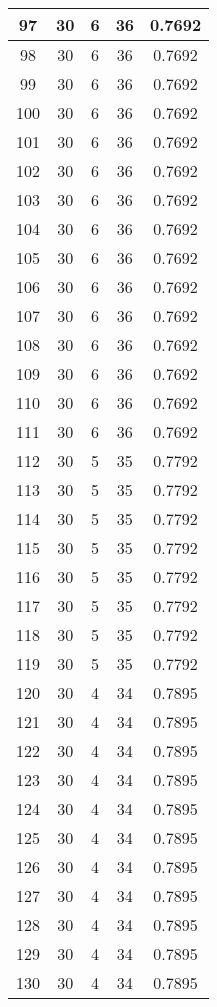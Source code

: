 \documentclass[letterpaper, 12pt]{article}
\begin{document}
\begin{longtable}{|c|c|c|c|c|}
\hline
97 & 30 & 6 & 36 & 0.7692 \\
\hline
98 & 30 & 6 & 36 & 0.7692 \\
\hline
99 & 30 & 6 & 36 & 0.7692 \\
\hline
100 & 30 & 6 & 36 & 0.7692 \\
\hline
101 & 30 & 6 & 36 & 0.7692 \\
\hline
102 & 30 & 6 & 36 & 0.7692 \\
\hline
103 & 30 & 6 & 36 & 0.7692 \\
\hline
104 & 30 & 6 & 36 & 0.7692 \\
\hline
105 & 30 & 6 & 36 & 0.7692 \\
\hline
106 & 30 & 6 & 36 & 0.7692 \\
\hline
107 & 30 & 6 & 36 & 0.7692 \\
\hline
108 & 30 & 6 & 36 & 0.7692 \\
\hline
109 & 30 & 6 & 36 & 0.7692 \\
\hline
110 & 30 & 6 & 36 & 0.7692 \\
\hline
111 & 30 & 6 & 36 & 0.7692 \\
\hline
112 & 30 & 5 & 35 & 0.7792 \\
\hline
113 & 30 & 5 & 35 & 0.7792 \\
\hline
114 & 30 & 5 & 35 & 0.7792 \\
\hline
115 & 30 & 5 & 35 & 0.7792 \\
\hline
116 & 30 & 5 & 35 & 0.7792 \\
\hline
117 & 30 & 5 & 35 & 0.7792 \\
\hline
118 & 30 & 5 & 35 & 0.7792 \\
\hline
119 & 30 & 5 & 35 & 0.7792 \\
\hline
120 & 30 & 4 & 34 & 0.7895 \\
\hline
121 & 30 & 4 & 34 & 0.7895 \\
\hline
122 & 30 & 4 & 34 & 0.7895 \\
\hline
123 & 30 & 4 & 34 & 0.7895 \\
\hline
124 & 30 & 4 & 34 & 0.7895 \\
\hline
125 & 30 & 4 & 34 & 0.7895 \\
\hline
126 & 30 & 4 & 34 & 0.7895 \\
\hline
127 & 30 & 4 & 34 & 0.7895 \\
\hline
128 & 30 & 4 & 34 & 0.7895 \\
\hline
129 & 30 & 4 & 34 & 0.7895 \\
\hline
130 & 30 & 4 & 34 & 0.7895 \\

\end{longtable}
\end{document}
